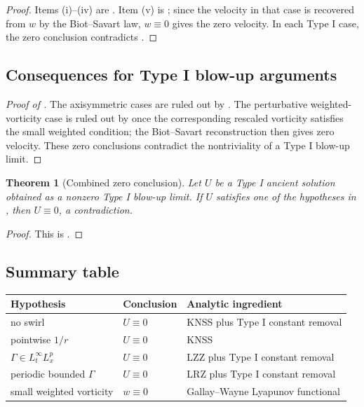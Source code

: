 \documentclass[11pt]{amsart}
\theoremstyle{plain}
\newtheorem{theorem}{Theorem}[section]
\theoremstyle{definition}
\theoremstyle{remark}
\numberwithin{equation}{section}
\begin{document}
\begin{proof}
Items (i)--(iv) are .  Item (v) is
; since the velocity in that
case is recovered from \(w\) by the Biot--Savart law, \(w\equiv0\) gives the
zero velocity.  In each Type I case, the zero conclusion contradicts
.
\end{proof}

\subsection{Consequences for Type I blow-up arguments}

\begin{proof}[Proof of ]
The axisymmetric cases are ruled out by .  The
perturbative weighted-vorticity case is ruled out by
 once the corresponding rescaled
vorticity satisfies the small weighted condition; the Biot--Savart
reconstruction then gives zero velocity.  These zero conclusions contradict
the nontriviality of a Type I blow-up limit.
\end{proof}

\begin{theorem}[Combined zero conclusion]
\label{p3:thm:stated-hypotheses-zero}
Let \(U\) be a Type I ancient solution obtained as a nonzero Type I blow-up
limit.  If \(U\) satisfies one of the hypotheses in
, then \(U\equiv0\), a contradiction.
\end{theorem}

\begin{proof}
This is .
\end{proof}

\subsection{Summary table}

\begin{center}
\begin{tabular}{p{}p{}p{}}
\hline
Hypothesis & Conclusion & Analytic ingredient \\
\hline
no swirl & \(U\equiv0\) & KNSS plus Type I constant removal \\
pointwise \(1/r\) & \(U\equiv0\) & KNSS \\
\(\Gamma\in L_t^\infty L_x^p\) & \(U\equiv0\) & LZZ plus Type I constant removal \\
periodic bounded \(\Gamma\) & \(U\equiv0\) & LRZ plus Type I constant removal \\
small weighted vorticity & \(w\equiv0\) & Gallay--Wayne Lyapunov functional \\
\hline
\end{tabular}
\end{center}
\end{document}

